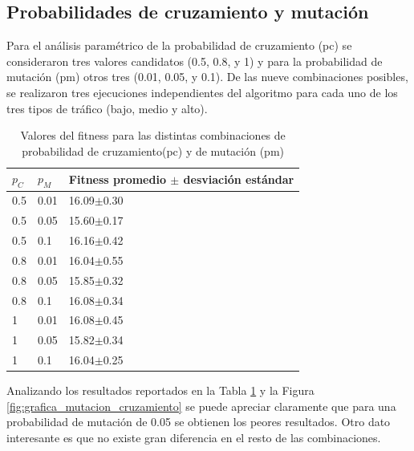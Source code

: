 \subsection{Probabilidades de cruzamiento y mutación}

Para el análisis paramétrico de la probabilidad de cruzamiento (pc) se consideraron tres valores candidatos (0.5, 0.8, y 1) y para la probabilidad de mutación (pm) otros tres (0.01,  0.05,  y  0.1). De las nueve combinaciones posibles, se realizaron tres ejecuciones independientes del algoritmo para cada uno de los tres tipos de tráfico (bajo, medio y alto).  
 
 \begin{table}[H]
 	\renewcommand{\arraystretch}{1.2}
 	\caption{Valores del fitness para las distintas combinaciones de probabilidad de cruzamiento(pc) y de mutación (pm)}
 	\label{table:parametro_mutacion_cruzamiento}
 	\centering
 	\begin{tabular}{p{1cm}p{1cm}p{3.5cm} }
 		\hline
 		$p_C$& 
 		$p_M$ & 
 		Fitness promedio  $\pm$ desviación estándar\\ 
 		\hline
 		0.5 & 0.01  &  16.09$\pm$0.30\\
 		0.5 & 0.05 &  15.60$\pm$0.17\\
 		0.5 & 0.1  &  16.16$\pm$0.42\\
 		0.8 & 0.01  &  16.04$\pm$0.55\\
 		0.8 & 0.05  &  15.85$\pm$0.32\\
 		0.8 & 0.1  &  16.08$\pm$0.34\\
 		1 & 0.01 &  16.08$\pm$0.45\\
 		1 & 0.05 &  15.82$\pm$0.34\\
 		1 & 0.1 &  16.04$\pm$0.25\\
 		\hline
 	\end{tabular}
 \end{table}
 
Analizando los resultados reportados en la Tabla \ref{table:parametro_mutacion_cruzamiento} y la Figura \ref{fig:grafica_mutacion_cruzamiento} se puede apreciar claramente que para una probabilidad de mutación de 0.05 se obtienen los peores resultados. Otro dato interesante es que no existe gran diferencia en el resto de las combinaciones.

